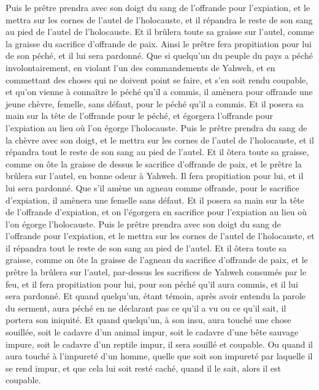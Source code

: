 \begin{multicols}{2}
Puis le prêtre prendra avec son doigt du sang de l'offrande pour l'expiation, et le mettra sur les cornes de l'autel de l'holocauste, et il répandra le reste de son sang au pied de l'autel de l'holocauste.
Et il brûlera toute sa graisse sur l'autel, comme la graisse du sacrifice d'offrande de paix. Ainsi le prêtre fera propitiation pour lui de son péché, et il lui sera pardonné.
Que si quelqu'un du peuple du pays a péché involontairement, en violant l'un des commandements de Yahweh, et en commettant des choses qui ne doivent point se faire, et s'en soit rendu coupable,
et qu'on vienne à connaître le péché qu'il a commis, il amènera pour offrande une jeune chèvre, femelle, sans défaut, pour le péché qu'il a commis.
Et il posera sa main sur la tête de l'offrande pour le péché, et égorgera l'offrande pour l'expiation au lieu où l'on égorge l'holocauste.
Puis le prêtre prendra du sang de la chèvre avec son doigt, et le mettra sur les cornes de l'autel de l'holocauste, et il répandra tout le reste de son sang au pied de l'autel.
Et il ôtera toute sa graisse, comme on ôte la graisse de dessus le sacrifice d'offrande de paix, et le prêtre la brûlera sur l'autel, en bonne odeur à Yahweh. Il fera propitiation pour lui, et il lui sera pardonné.
Que s'il amène un agneau comme offrande, pour le sacrifice d'expiation, il amènera une femelle sans défaut.
Et il posera sa main sur la tête de l'offrande d'expiation, et on l'égorgera en sacrifice pour l'expiation au lieu où l'on égorge l'holocauste.
Puis le prêtre prendra avec son doigt du sang de l'offrande pour l'expiation, et le mettra sur les cornes de l'autel de l'holocauste, et il répandra tout le reste de son sang au pied de l'autel.
Et il ôtera toute sa graisse, comme on ôte la graisse de l'agneau du sacrifice d'offrande de paix, et le prêtre la brûlera sur l'autel, par-dessus les sacrifices de Yahweh consumés par le feu, et il fera propitiation pour lui, pour son péché qu'il aura commis, et il lui sera pardonné.
\VerseOne{}Et quand quelqu'un, étant témoin, après avoir entendu la parole du serment, aura péché en ne déclarant pas ce qu'il a vu ou ce qu'il sait, il portera son iniquité.
Et quand quelqu'un, à son insu, aura touché une chose souillée, soit le cadavre d'un animal impur, soit le cadavre d'une bête sauvage impure, soit le cadavre d'un reptile impur, il sera souillé et coupable.
Ou quand il aura touché à l'impureté d'un homme, quelle que soit son impureté par laquelle il se rend impur, et que cela lui soit resté caché, quand il le sait, alors il est coupable.

\end{multicols}
